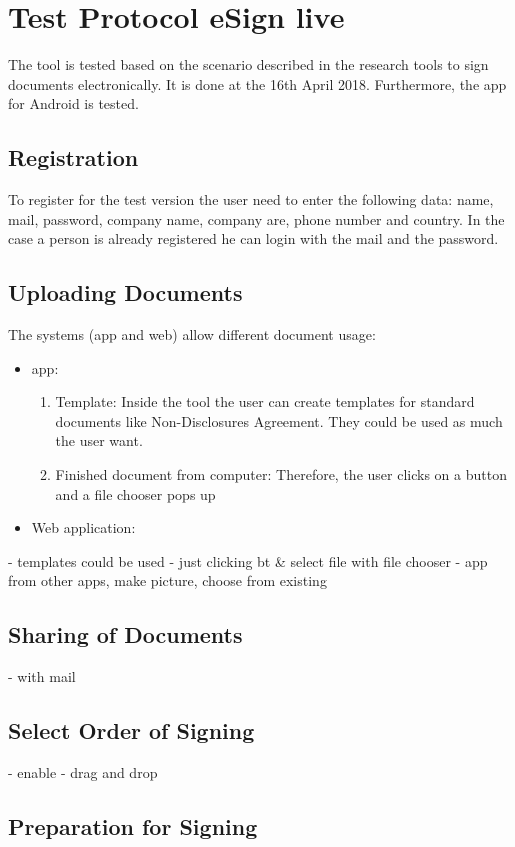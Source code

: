 \section{Test Protocol eSign live}
\label{sec:esign}
The tool is tested based on the scenario described in the research tools to sign documents electronically. It is done at the 16th April 2018. Furthermore, the \gls{app} for Android is tested.

\subsection{Registration}
To register for  the test version the user need to enter the following data: name, mail, password, company name, company are, phone number and country. In the case a person is already registered he can login with the mail and the password.

\subsection{Uploading Documents}
The systems (\gls{app} and web) allow different document usage:
\begin{itemize}
	\item \Gls{app}:
	\begin{enumerate}
		\item Template: Inside the tool the user can create templates for standard documents like Non-Disclosures Agreement. They could be used as much the user want.
		\item Finished document from computer: Therefore, the user clicks on a button and a file chooser pops up
	\end{enumerate}
	\item Web application:
\end{itemize}

- templates could be used
- just clicking bt \& select file with file chooser
- app from other apps, make picture, choose from existing

\subsection{Sharing of Documents}
- with mail

\subsection{Select Order of Signing}
- enable
- drag and drop

\subsection{Preparation for Signing}

